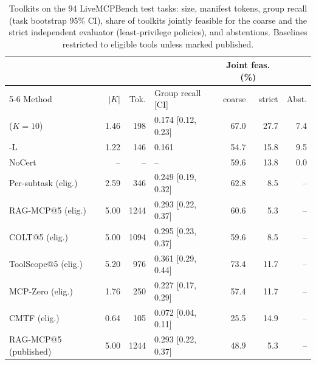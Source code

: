 \begin{table}[t]
\centering
\caption{Toolkits on the 94 LiveMCPBench test tasks: size, manifest tokens, group recall (task bootstrap 95\%
CI), share of toolkits jointly feasible for the coarse and the strict independent evaluator (least-privilege
policies), and abstentions. Baselines restricted to eligible tools unless marked published.}
\label{tab:ev-sets}
\scriptsize
\setlength{\tabcolsep}{2.1pt}
\begin{tabular}{@{}lrrlrrr@{}}
\toprule
 & & & & \multicolumn{2}{c}{Joint feas. (\%)} & \\
\cmidrule(lr){5-6}
Method & $|K|$ & Tok. & Group recall [CI] & coarse & strict & Abst. \\
\midrule
\pamcp{} ($K{=}10$) & 1.46 & 198 & 0.174 [0.12, 0.23] & 67.0 & 27.7 & 7.4 \\
\pamcp{}-L & 1.22 & 146 & 0.161 & 54.7 & 15.8 & 9.5 \\
\pamcp{} NoCert & -- & -- & -- & 59.6 & 13.8 & 0.0 \\
Per-subtask (elig.) & 2.59 & 346 & 0.249 [0.19, 0.32] & 62.8 & 8.5 & -- \\
RAG-MCP@5 (elig.) & 5.00 & 1244 & 0.293 [0.22, 0.37] & 60.6 & 5.3 & -- \\
COLT@5 (elig.) & 5.00 & 1094 & 0.295 [0.23, 0.37] & 59.6 & 8.5 & -- \\
ToolScope@5 (elig.) & 5.20 & 976 & 0.361 [0.29, 0.44] & 73.4 & 11.7 & -- \\
MCP-Zero (elig.) & 1.76 & 250 & 0.227 [0.17, 0.29] & 57.4 & 11.7 & -- \\
CMTF (elig.) & 0.64 & 105 & 0.072 [0.04, 0.11] & 25.5 & 14.9 & -- \\
RAG-MCP@5 (published) & 5.00 & 1244 & 0.293 [0.22, 0.37] & 48.9 & 5.3 & -- \\
\bottomrule
\end{tabular}
\end{table}
